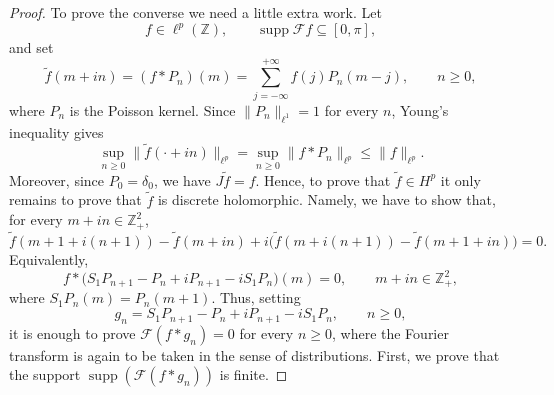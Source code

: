 \documentclass[12pt,a4paper,reqno]{amsart}
\DeclareMathOperator*{\supp}{supp}
\theoremstyle{definition}
\theoremstyle{definition}\newtheorem{defn}[thm]{Definition}
\begin{document}
\begin{proof}
    
    To prove the converse we need a little extra work. Let
    \[
    f\in \ell^p(\mathbb Z),
    \qquad
    \operatorname{supp}\mathcal F f\subseteq[0,\pi],
    \]
    and set
    \[
    \widetilde f(m+in)=(f*P_n)(m)=\sum_{j=-\infty}^{+\infty}f(j)P_n(m-j),
    \qquad n\geqslant0,
    \]
    where $P_n$ is the Poisson kernel.
    Since \(\|P_n\|_{\ell^1}=1\) for every $n$, Young's
    inequality gives
    \[
    \sup_{n\geqslant 0}\|\widetilde f(\cdot+in)\|_{\ell^p}
    =\sup_{n\geqslant 0}
    \|f*P_n\|_{\ell^p}
    \leqslant
    \|f\|_{\ell^p}.
    \]
    Moreover, since \(P_0=\delta_0\), we have \(J\widetilde f=f\). Hence, to prove that $\widetilde f\in H^p$ it only remains to prove that $\widetilde f$ is discrete holomorphic. Namely, we have to  show that, for every $m+in\in\mathbb Z^2_+$,
    \[
    \widetilde f(m+1+i(n+1))-\widetilde f(m+in)+i\big(\widetilde f(m+i(n+1))-\widetilde f(m+1+in)\big)=0.
    \]
    Equivalently,
    \[
    f*
    \big(S_1 P_{n+1}-P_n+iP_{n+1}-iS_1 P_n\big)(m)=0,\qquad m+in\in\mathbb Z^2_+,
    \]
    where $S_1 P_n(m)=P_n(m+1)$. 
    Thus, setting
    \[
    g_n
    =
    S_1 P_{n+1}-P_n+iP_{n+1}-iS_1 P_n,\qquad n\geqslant 0,
    \]
    it is enough to prove 
    $\mathcal F(f\ast g_n)=0$ for every $n\geqslant 0$, where the Fourier transform is again to be taken in the sense of distributions. First, we prove that the support $\supp(\mathcal F(f\ast  g_n))$ is finite. 
    

\end{proof}
\end{document}
